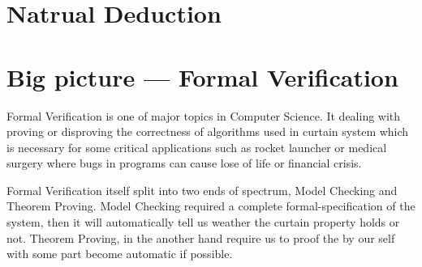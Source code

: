 \documentclass[master.tex]{subfiles}
\begin{document}



\section{Natrual Deduction}

\section{Big picture --- Formal Verification}
Formal Verification is one of major topics in Computer Science. It dealing with proving or disproving the correctness of algorithms used in curtain system\supercite{formal-verification-wiki}  which is necessary for some critical applications such as rocket launcher or medical surgery where bugs in programs can cause lose of life or financial crisis.

Formal Verification itself split into two ends of spectrum, Model Checking and Theorem Proving. Model Checking required a complete formal-specification of the system, then it will automatically tell us weather the curtain property holds or not. Theorem Proving, in the another hand require us to proof the by our self with some part become automatic if possible.
\end{document}

